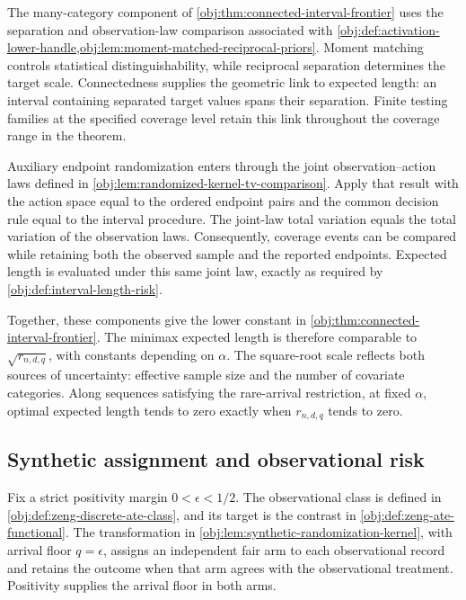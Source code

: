 The many-category component of \cref{obj:thm:connected-interval-frontier} uses the separation and observation-law comparison associated with \cref{obj:def:activation-lower-handle,obj:lem:moment-matched-reciprocal-priors}. Moment matching controls statistical distinguishability, while reciprocal separation determines the target scale. Connectedness supplies the geometric link to expected length: an interval containing separated target values spans their separation. Finite testing families at the specified coverage level retain this link throughout the coverage range in the theorem.

Auxiliary endpoint randomization enters through the joint observation--action laws defined in \cref{obj:lem:randomized-kernel-tv-comparison}. Apply that result with the action space equal to the ordered endpoint pairs and the common decision rule equal to the interval procedure. The joint-law total variation equals the total variation of the observation laws. Consequently, coverage events can be compared while retaining both the observed sample and the reported endpoints. Expected length is evaluated under this same joint law, exactly as required by \cref{obj:def:interval-length-risk}.

Together, these components give the lower constant  in \cref{obj:thm:connected-interval-frontier}. The minimax expected length  is therefore comparable to \(\sqrt{r_{n,d,q}}\), with constants depending on \(\alpha\). The square-root scale reflects both sources of uncertainty: effective sample size and the number of covariate categories. Along sequences satisfying the rare-arrival restriction, at fixed \(\alpha\), optimal expected length tends to zero exactly when \(r_{n,d,q}\) tends to zero.

\subsection{Synthetic assignment and observational risk}

Fix a strict positivity margin \(0<\epsilon<1/2\). The observational class  is defined in \cref{obj:def:zeng-discrete-ate-class}, and its target is the contrast in \cref{obj:def:zeng-ate-functional}. The transformation in \cref{obj:lem:synthetic-randomization-kernel}, with arrival floor \(q=\epsilon\), assigns an independent fair arm to each observational record and retains the outcome when that arm agrees with the observational treatment. Positivity supplies the arrival floor in both arms.

